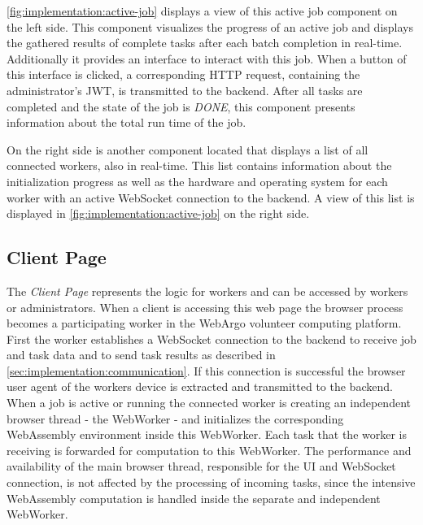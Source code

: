 \autoref{fig:implementation:active-job} displays a view of this active job component on the left side. This component visualizes the progress of an active job and displays the gathered results of complete tasks after each batch completion in real-time. Additionally it provides an interface to interact with this job. When a button of this interface is clicked, a corresponding \acs{HTTP} request, containing the administrator's \ac{JWT}, is transmitted to the backend. After all tasks are completed and the state of the job is \emph{DONE}, this component presents information about the total run time of the job. 

On the right side is another component located that displays a list of all connected workers, also in real-time. This list contains information about the initialization progress as well as the hardware and operating system for each worker with an active WebSocket connection to the backend. A view of this list is displayed in \autoref{fig:implementation:active-job} on the right side.

\subsection{Client Page}
\label{subsec:implementation:client-page}
The \emph{Client Page} represents the logic for workers and can be accessed by workers or administrators. When a client is accessing this web page the browser process becomes a participating worker in the WebArgo volunteer computing platform. First the worker establishes a WebSocket connection to the backend to receive job and task data and to send task results as described in \autoref{sec:implementation:communication}. If this connection is successful the browser user agent of the workers device is extracted and transmitted to the backend. When a job is active or running the connected worker is creating an independent browser thread - the WebWorker - and initializes the corresponding WebAssembly environment inside this WebWorker. Each task that the worker is receiving is forwarded for computation to this WebWorker. The performance and availability of the main browser thread, responsible for the \ac{UI} and WebSocket connection, is not affected by the processing of incoming tasks, since the intensive WebAssembly computation is handled inside the separate and independent WebWorker.

